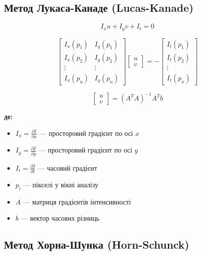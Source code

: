\documentclass[14pt, a4paper]{extarticle}
\numberwithin{equation}{section}
\begin{document}
\subsection{Метод Лукаса-Канаде (Lucas-Kanade)}

\begin{equation}
\boxed{I_x u + I_y v + I_t = 0} \tag{8}
\end{equation}

\begin{equation}
\begin{bmatrix} 
I_x(p_1) & I_y(p_1) \\ 
I_x(p_2) & I_y(p_2) \\ 
\vdots & \vdots \\ 
I_x(p_n) & I_y(p_n) 
\end{bmatrix} 
\begin{bmatrix} u \\ v \end{bmatrix} = 
-\begin{bmatrix} I_t(p_1) \\ I_t(p_2) \\ \vdots \\ I_t(p_n) \end{bmatrix} \tag{9}
\end{equation}

\begin{equation}
\boxed{\begin{bmatrix} u \\ v \end{bmatrix} = (A^T A)^{-1} A^T b} \tag{10}
\end{equation}

\textbf{де:}
\begin{itemize}
\item $I_x = \frac{\partial I}{\partial x}$ — просторовий градієнт по осі $x$
\item $I_y = \frac{\partial I}{\partial y}$ — просторовий градієнт по осі $y$
\item $I_t = \frac{\partial I}{\partial t}$ — часовий градієнт
\item $p_i$ — пікселі у вікні аналізу
\item $A$ — матриця градієнтів інтенсивності
\item $b$ — вектор часових різниць
\end{itemize}

\subsection{Метод Хорна-Шунка (Horn-Schunck)}
\end{document}

